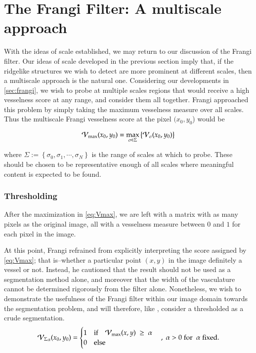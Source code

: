  \chapter{The Frangi Filter: A multiscale approach} \label{sec:frangi-multiscale}
    
     With the ideas of scale established, we may return to our discussion of the Frangi filter.
    Our ideas of scale developed in the previous section imply that, if the ridgelike structures we wish to detect are more prominent at different scales, then a multiscale approach is the natural one. Considering our
    developments in \cref{sec:frangi}, we wish to probe at multiple scales
    regions that would receive a high vesselness score at any range,
    and consider them all together. Frangi \cite{frangi-paper} approached this problem by simply taking the maximum vesselness measure over all scales. Thus the multiscale Frangi vesselness score at the pixel $(x_0, y_0$) would be 
    
    \begin{equation} \label{eq:Vmax}
    \mathcal{V}_{\max}(x_0, y_0) =
    	\underset{\sigma \in \Sigma}{\max}\left\{  \mathcal{V}_{\sigma} (x_0, y_0) \right\}
    \end{equation}
    
    where $\Sigma := \left\{ \sigma_0, \sigma_1 , \cdots, \sigma_N \right\}$ is
    the range of scales at which to probe. These should be chosen to be representative enough of all scales where meaningful content is expected to be found.
    
   
    \subsection{Thresholding}
    
    After the maximization in \cref{eq:Vmax}, we are left with a matrix with as many pixels as the original image, all with a vesselness measure between $0$ and $1$ for each pixel in the image.
       
    At this point, Frangi \cite{frangi-paper} refrained from explicitly interpreting the score assigned by \cref{eq:Vmax}; that is--whether a particular point $(x,y)$ in the image definitely a vessel or not. Instead, he cautioned that the result should not be used as a segmentation method alone, and moreover that the width of the vasculature cannot be determined rigorously from the filter alone.   
    Nonetheless, we wish to demonstrate the usefulness of the Frangi filter within our image domain towards the segmentation problem, and will therefore, like \cite{huynh2013filter}, consider a thresholded \Vmax as a crude segmentation. 
    \begin{equation}
    {\ensuremath{\mathcal{V}_{\Sigma}}}_{\alpha}(x_0,y_0) = \begin{cases}
    1 & \textrm{if}\quad \mathcal{V}_{\max}(x,y) \; \ge\;  \alpha \\
    0 & \textrm{else}
    \end{cases}  \quad , \; \alpha > 0
	    \; \textrm{for } \; \alpha \;\textrm{fixed}.
    \end{equation}
    

